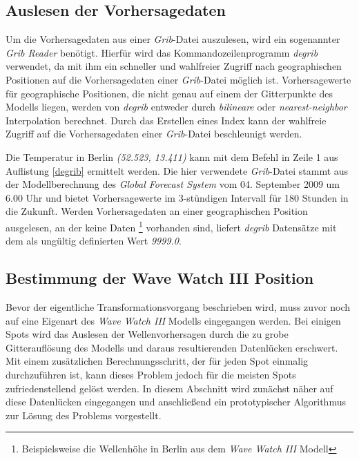 \subsection{Auslesen der Vorhersagedaten}
\label{auslesen-der-vorhersagedaten}
Um die Vorhersagedaten aus einer \textit{Grib}-Datei auszulesen, wird
ein sogenannter \textit{Grib Reader} benötigt. Hierfür wird das
Kommandozeilenprogramm \textit{degrib} verwendet, da mit ihm ein
schneller und wahlfreier Zugriff nach geographischen Positionen auf
die Vorhersagedaten einer \textit{Grib}-Datei möglich
ist. Vorhersagewerte für geographische Positionen, die nicht genau auf
einem der Gitterpunkte des Modells liegen, werden von \textit{degrib}
entweder durch \textit{bilineare} oder \textit{nearest-neighbor}
Interpolation berechnet. Durch das Erstellen eines Index kann der
wahlfreie Zugriff auf die Vorhersagedaten einer \textit{Grib}-Datei
beschleunigt werden.



Die Temperatur in Berlin \textit{(52.523, 13.411)} kann mit dem Befehl
in Zeile 1 aus Auflistung \ref{degrib} ermittelt werden. Die hier
verwendete \textit{Grib}-Datei stammt aus der Modellberechnung des
\textit{Global Forecast System} vom 04. September 2009 um 6.00 Uhr und
bietet Vorhersagewerte im 3-stündigen Intervall für 180 Stunden in die
Zukunft. Werden Vorhersagedaten an einer geographischen Position
ausgelesen, an der keine Daten \footnote{Beispielsweise die Wellenhöhe
  in Berlin aus dem \textit{Wave Watch III} Modell} vorhanden sind,
liefert \textit{degrib} Datensätze mit dem als ungültig definierten
Wert \textit{9999.0}.

\subsection{Bestimmung der Wave Watch III Position}
Bevor der eigentliche Transformationsvorgang beschrieben wird, muss
zuvor noch auf eine Eigenart des \textit{Wave Watch III} Modells
eingegangen werden. Bei einigen Spots wird das Auslesen der
Wellenvorhersagen durch die zu grobe Gitterauflösung des Modells und
daraus resultierenden Datenlücken erschwert. Mit einem zusätzlichen
Berechnungsschritt, der für jeden Spot einmalig durchzuführen ist,
kann dieses Problem jedoch für die meisten Spots zufriedenstellend
gelöst werden. In diesem Abschnitt wird zunächst näher auf diese
Datenlücken eingegangen und anschließend ein prototypischer
Algorithmus zur Lösung des Problems vorgestellt.

